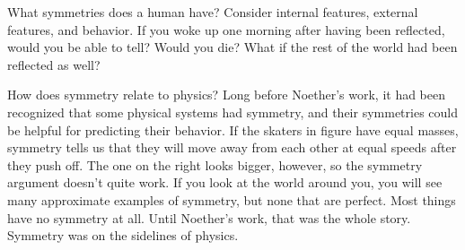 \pagebreak[4]

\dqheader
\begin{dq}
What symmetries does a human have? Consider internal features,
external features, and behavior. 
If you woke up one morning after having been reflected, would
you be able to tell? Would you die? What if the rest of the world
had been reflected as well?
\end{dq}

\vfill


How does symmetry relate to physics? Long before Noether's work, it had been
recognized that some physical systems had symmetry, and their symmetries could
be helpful for predicting their behavior. If the skaters in
figure  have equal masses, symmetry tells us that they will
move away from each other at equal speeds after they push off. 
The one on the right looks bigger, however, so the symmetry argument doesn't
quite work. If you look at the world around you, you will see many approximate
examples of symmetry, but none that are perfect. Most things have
no symmetry at all. Until Noether's work, that was the whole story.
Symmetry was on the sidelines of physics.\label{original-skaters}

